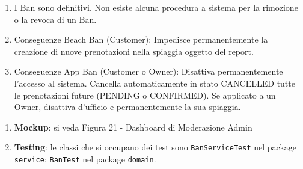 \documentclass{article}
\begin{document}
	{
		\begin{enumerate}[nosep, leftmargin=*]
			\item[•] I Ban sono definitivi. Non esiste alcuna procedura a sistema per la rimozione o la revoca di un Ban.
			\item[•] Conseguenze Beach Ban (Customer): Impedisce permanentemente la creazione di nuove prenotazioni nella spiaggia oggetto del report.
			\item[•] Conseguenze App Ban (Customer o Owner): Disattiva permanentemente l'accesso al sistema. Cancella automaticamente in stato CANCELLED tutte le prenotazioni future (PENDING o CONFIRMED). Se applicato a un Owner, disattiva d'ufficio e permanentemente la sua spiaggia.
		\end{enumerate}
		
		\begin{enumerate}[leftmargin=*]
		\item[•] \textbf{Mockup}: si veda Figura 21 - Dashboard di Moderazione Admin 
		
		\item[•] \textbf{Testing}: le classi che si occupano dei test sono \texttt{BanServiceTest} nel package \texttt{service}; \texttt{BanTest} nel package \texttt{domain}.
	\end{enumerate}
	}
\end{document}
